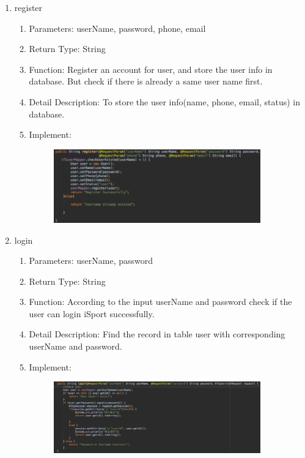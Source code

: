 \documentclass[16pt]{scrreprt}
\begin{document}
\begin{enumerate}
\begin{enumerate}
\begin{figure}[H]
\end{figure}
    \end{enumerate}
    \item register
    \begin{enumerate}
        \item Parameters: userName, password, phone, email
        \item Return Type: String
        \item Function: Register an account for user, and store the user info in database. But check if there is already a same user name first.
        \item Detail Description: To store the user info(name, phone, email, status) in database.
        \item Implement:
        \begin{figure}[H]
    \centering
    \includegraphics[width=0.9\textwidth]{diagrams/registerfunc.png}\\
\end{figure}
\end{enumerate}
    \item login
    \begin{enumerate}
        \item Parameters: userName, password
        \item Return Type: String
        \item Function: According to the input userName and password check if the user can login iSport successfully.
        \item Detail Description: Find the record in table user with corresponding userName and password.
        \item Implement:
        \begin{figure}[H]
    \centering
    \includegraphics[width=0.9\textwidth]{diagrams/loginfunc.png}\\

\end{figure}
\end{enumerate}
\end{enumerate}
\end{document}
